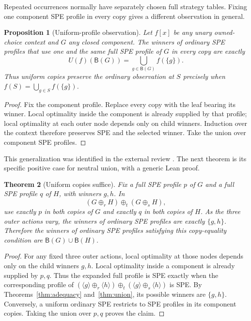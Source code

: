 \documentclass[11pt]{article}
\newtheorem{theorem}{Theorem}[section]
\newtheorem{proposition}[theorem]{Proposition}
\newcommand{\at}[1]{\langle #1\rangle}
\newcommand{\ch}[1]{\mathbin{\oplus_{#1}}}
\newcommand{\B}{\mathsf B}
\begin{document}
Repeated occurrences normally have separately chosen full strategy
tables. Fixing one component SPE profile in every copy gives a different
observation in general.

\begin{proposition}[Uniform-profile observation]
Let $f[x]$ be any unary owned-choice context and $G$ any closed component.
The winners of ordinary SPE profiles that use one and the same full SPE
profile of $G$ in every copy are exactly
\[
 U(f)(\B(G))=\bigcup_{g\in\B(G)}f(\{g\}).
\]
Thus uniform copies preserve the ordinary observation at $S$ precisely
when $f(S)=\bigcup_{g\in S}f(\{g\})$.
\end{proposition}
\begin{proof}
Fix the component profile. Replace every copy with the leaf bearing its
winner. Local optimality inside the component is already supplied by
that profile; local optimality at each outer node depends only on child
winners. Induction over the context therefore preserves SPE and the
selected winner. Take the union over component SPE profiles.
\end{proof}

This generalization was identified in the external review
. The next theorem is its
specific positive case for neutral union, with a generic Lean proof.

\begin{theorem}[Uniform copies suffice]\label{thm:uniform}
Fix a full SPE profile $p$ of $G$ and a full SPE profile $q$ of $H$, with
winners $g,h$. In
\[
  (G\ch r H)\ch t(G\ch s H),
\]
use exactly $p$ in both copies of $G$ and exactly $q$ in both copies of
$H$. As the three outer actions vary, the winners of ordinary SPE
profiles are exactly $\{g,h\}$. Therefore the winners of ordinary SPE
profiles satisfying this copy-equality condition are
$\B(G)\cup\B(H)$.
\end{theorem}
\begin{proof}
For any fixed three outer actions, local optimality at those nodes depends
only on the child winners $g,h$. Local optimality inside a component is
already supplied by $p,q$. Thus the expanded full profile is SPE exactly
when the corresponding profile of
$(\at g\ch r\at h)\ch t(\at g\ch s\at h)$ is SPE. By
Theorems~\ref{thm:adequacy} and~\ref{thm:union}, its possible winners are
$\{g,h\}$. Conversely, a uniform ordinary SPE restricts to SPE profiles
in its component copies. Taking the union over $p,q$ proves the claim.
\end{proof}
\end{document}
